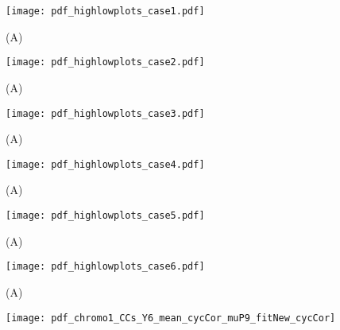 \begin{figure}%
	\centering
	\texttt{[image: pdf\_highlowplots\_case1.pdf]}
	\caption{ 
		(A) 
	}
	\label{fig:CRP:XXX}
\end{figure}%
\begin{figure}%
	\centering
	\texttt{[image: pdf\_highlowplots\_case2.pdf]}
	\caption{ 
		(A) 
	}
	\label{fig:CRP:XXX}
\end{figure}%
\begin{figure}%
	\centering
	\texttt{[image: pdf\_highlowplots\_case3.pdf]}
	\caption{ 
		(A) 
	}
	\label{fig:CRP:XXX}
\end{figure}%
\begin{figure}%
	\centering
	\texttt{[image: pdf\_highlowplots\_case4.pdf]}
	\caption{ 
		(A) 
	}
	\label{fig:CRP:XXX}
\end{figure}%
\begin{figure}%
	\centering
	\texttt{[image: pdf\_highlowplots\_case5.pdf]}
	\caption{ 
		(A) 
	}
	\label{fig:CRP:XXX}
\end{figure}%
\begin{figure}%
	\centering
	\texttt{[image: pdf\_highlowplots\_case6.pdf]}
	\caption{ 
		(A) 
	}
	\label{fig:CRP:XXX}
\end{figure}%



\begin{figure}
	\centering
	\texttt{[image: pdf\_chromo1\_CCs\_Y6\_mean\_cycCor\_muP9\_fitNew\_cycCor]}
	\clearpage %
	\label{fig:XXX:XXX}
\end{figure}	

\clearpage


